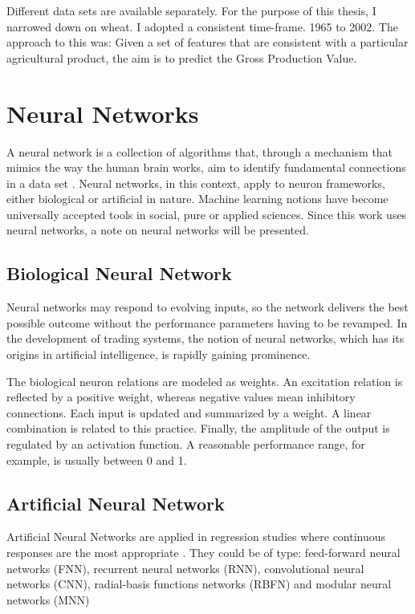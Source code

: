 Different data sets are available separately. For the purpose of this thesis, I narrowed down on wheat. I adopted a consistent time-frame. 1965 to 2002. The approach to this was: Given a set of features that are consistent with a particular agricultural product, the aim is to predict the Gross Production Value.

\section{Neural Networks}
A neural network is a collection of algorithms that, through a mechanism that mimics the way the human brain works, aim to identify fundamental connections in a data set \cite{jain1999recurrent}.  Neural networks, in this context, apply to neuron frameworks, either biological or artificial in nature. Machine learning notions have become universally accepted tools in social, pure or applied sciences. Since this work uses neural networks, a note on neural networks will be presented.

\subsection{Biological Neural Network}
Neural networks may respond to evolving inputs, so the network delivers the best possible outcome without the performance parameters having to be revamped. In the development of trading systems, the notion of neural networks, which has its origins in artificial intelligence, is rapidly gaining prominence\cite{krose1993introduction}.


The biological neuron relations are modeled as weights. An excitation relation is reflected by a positive weight, whereas negative values mean inhibitory connections. Each input is updated and summarized by a weight. A linear combination is related to this practice. Finally, the amplitude of the output is regulated by an activation function. A reasonable performance range, for example, is usually between 0 and 1.

\subsection{Artificial Neural Network}

Artificial Neural Networks are applied in regression studies where continuous responses are the most appropriate \cite{haykin2009neural}. They could be of type: feed-forward neural networks (FNN), recurrent neural networks (RNN), convolutional neural networks (CNN), radial-basis functions networks (RBFN) and modular neural networks (MNN) \cite{nielsen2015neural,goyal2013artificial,grossberg2013recurrent,ripley2007pattern}

